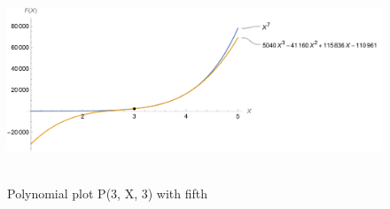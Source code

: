 ﻿\begin{figure}[H]
    \centering
    \includegraphics[width=1\textwidth]{sections/images/05_plots_polynomial_p3_n3_with_seventh}
    ~\caption{Polynomial plot P(3, X, 3) with fifth}\label{fig:figure11}
\end{figure}
